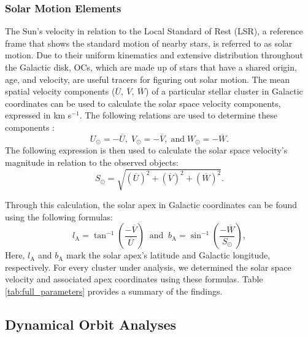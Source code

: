 \documentclass[referee]{raa}            %
\begin{document}
\subsubsection{Solar Motion Elements}

The Sun's velocity in relation to the Local Standard of Rest (LSR), a reference frame that shows the standard motion of nearby stars, is referred to as solar motion. Due to their uniform kinematics and extensive distribution throughout the Galactic disk, OCs, which are made up of stars that have a shared origin, age, and velocity, are useful tracers for figuring out solar motion. The mean spatial velocity components ($\overline{U},~\overline{V},~\overline{W}$) of a particular stellar cluster in Galactic coordinates can be used to calculate the solar space velocity components, expressed in km s$^{-1}$. The following relations are used to determine these components \citep{Elsanhoury2016, Elsanhoury2022, Haroon2025}:
\begin{equation} \label{Eq.16}
U_{\odot} = -\overline{U}, \; V_{\odot} = -\overline{V}, \; \text{and} \; W_{\odot} = -\overline{W}.
\end{equation}
The following expression is then used to calculate the solar space velocity's magnitude in relation to the observed objects:
\begin{equation} \label{Eq. 17}
S_{\odot}=\sqrt{(\overline{U})^2+(\overline{V})^2+(\overline{W})^2}.
\end{equation}

Through this calculation, the solar apex in Galactic coordinates can be found using the following formulas:
\begin{equation} \label{Eq. 18}
l_\text{A} = \tan^{-1}\left(\frac{-\overline{V}}{\overline{U}}\right) \;\; \text{and} \;\;
b_\text{A} = \sin^{-1} \left(\frac{-\overline{W}}{S_\odot}\right),
\end{equation}
Here, $l_\text{A}$ and $b_\text{A}$ mark the solar apex's latitude and Galactic longitude, respectively.  For every cluster under analysis, we determined the solar space velocity and associated apex coordinates using these formulas. Table \ref{tab:full_parameters} provides a summary of the findings.

\subsection{Dynamical Orbit Analyses}
\label{sec:orbit}
\end{document}
